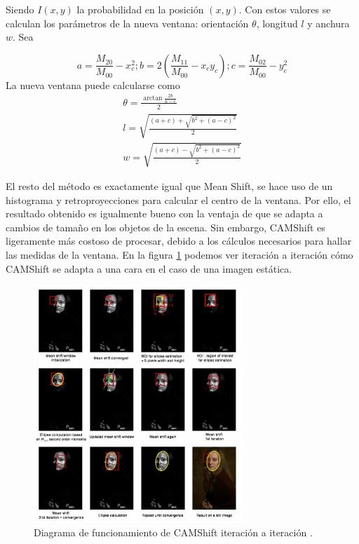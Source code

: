 Siendo $I(x,y)$ la probabilidad en la posición $(x,y)$. Con estos valores se calculan los parámetros de la nueva ventana: orientación $\theta$, longitud $l$ y anchura $w$. Sea

\[
a = \frac{M_{20}}{M_{00}} - x_c^2 ; b = 2(\frac{M_{11}}{M_{00}}-x_cy_c) ; c = \frac{M_{02}}{M_{00}} - y_c^2
\]
La nueva ventana puede calcularse como
\begin{gather*}
  \theta = \frac{\arctan \frac{2b}{a-c}}{2} \\
  l = \sqrt{\frac{(a+c)+\sqrt{b^2+(a-c)^2}}{2}} \\
  w = \sqrt{\frac{(a+c)-\sqrt{b^2+(a-c)^2}}{2}}
\end{gather*}

El resto del método es exactamente igual que Mean Shift, se hace uso de un histograma y retroproyecciones para calcular el centro de la ventana. Por ello, el resultado obtenido es igualmente bueno con la ventaja de que se adapta a cambios de tamaño en los objetos de la escena. Sin embargo, CAMShift es ligeramente más costoso de procesar, debido a los cálculos necesarios para hallar las medidas de la ventana. En la figura \ref{fig:camshiftopencv} podemos ver iteración a iteración cómo CAMShift se adapta a una cara en el caso de una imagen estática.

\begin{figure}
    \centering
    \includegraphics[width=0.7\textwidth]{images/camshift}
    \caption{Diagrama de funcionamiento de CAMShift iteración a iteración \cite{wiki:camshift}.}
    \label{fig:camshiftopencv}
\end{figure}


